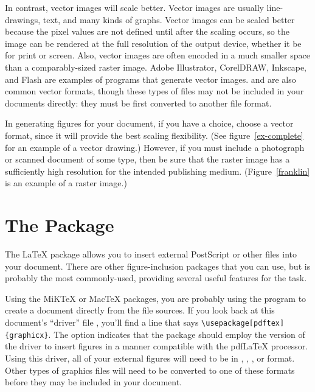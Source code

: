 In contrast, vector images will scale better.  Vector images are
usually line-drawings, text, and many kinds of graphs.  Vector images
can be scaled better because the pixel values are not defined until
after the scaling occurs, so the image can be rendered at the full
resolution of the output device, whether it be for print or screen.
Also, vector images are often encoded in a much smaller space than a
comparably-sized raster image.  Adobe Illustrator, CorelDRAW,
Inkscape, and Flash are examples of programs that generate vector
images.   and  are also common vector formats,
though these types of files may not be included in your documents
directly: they must be first converted to another file format.

In generating figures for your document, if you have a choice, choose
a vector format, since it will provide the best scaling flexibility.
(See figure~\ref{ex-complete} for an example of a vector drawing.)
However, if you must include a photograph or scanned document of some
type, then be sure that the raster image has a sufficiently high
resolution for the intended publishing medium. (Figure~\ref{franklin}
is an example of a  raster image.)

\section{The  Package}
The \LaTeX{} package  allows you to insert external
PostScript or other files into your document.  There are other
figure-inclusion packages that you can use, but  is
probably the most commonly-used, providing several useful features for
the task.

Using the MiK\TeX{} or Mac\TeX{} packages, you are probably using the
 program to create a  document directly from
the file sources.  If you look back at this document's ``driver'' file
, you'll find a line that says
\verb|\usepackage[pdftex]{graphicx}|.  The option 
indicates that the  package should employ the
 version of the driver to insert figures in a manner
compatible with the pdf\LaTeX{} processor.  Using this driver, all of
your external figures will need to be in , ,
, or  format.  Other types of graphics files will
need to be converted to one of these formats before they may be
included in your document.

